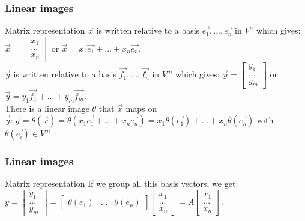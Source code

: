 \begin{frame}
	\frametitle{Linear images}
	\begin{block}{Matrix representation}
		$\overrightarrow{x}$ is written relative to a basis $\overrightarrow{e_1},...,\overrightarrow{e_n}$ in $V^n$ which gives: $\overrightarrow{x}=\begin{bmatrix}
		x_1\\...\\x_n
		\end{bmatrix}$ or $ \overrightarrow{x}=x_1\overrightarrow{e_1}+...+x_n\overrightarrow{e_n}$.\\ $\overrightarrow{y}$ is written relative to a basis $\overrightarrow{f_1},...,\overrightarrow{f_n}$ in $V^m$ which gives: $\overrightarrow{y}=\begin{bmatrix}
		y_1\\...\\y_m
		\end{bmatrix}$ or $ \overrightarrow{y}=y_1\overrightarrow{f_1}+...+y_m\overrightarrow{f_m}$. \\
		There is a linear image $\theta$ that $\overrightarrow{x}$ maps on $\overrightarrow{y}:\overrightarrow{y}=\theta(\overrightarrow{x})=\theta(x_1\overrightarrow{e_1}+...+x_n\overrightarrow{e_n})=x_1\theta(\overrightarrow{e_1})+...+x_n\theta(\overrightarrow{e_n})$ with $\theta(\overrightarrow{e_i})\in V^m$.
	\end{block}
\end{frame}

\begin{frame}
	\frametitle{Linear images}
	\begin{block}{Matrix representation}
		If we group all this basis vectors, we get: $y=\begin{bmatrix}
		y_1\\...\\y_m \end{bmatrix}=\begin{bmatrix}
		\theta(e_1) & ... & \theta(e_n)
		\end{bmatrix}\begin{bmatrix}
		x_1\\...\\x_n
		\end{bmatrix}=A\begin{bmatrix}
		x_1\\...\\x_n
		\end{bmatrix}$.\\
		\vspace{4mm}
	\end{block}
\end{frame}

